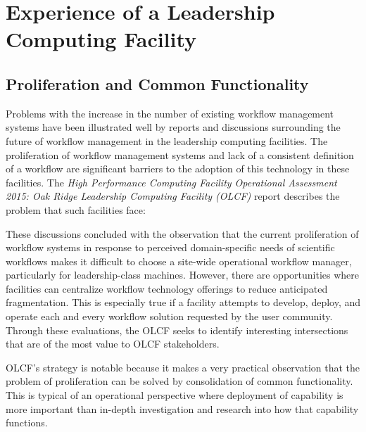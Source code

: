 \section{Experience of a Leadership Computing Facility}\label{olcf}

\subsection{Proliferation and Common Functionality} \label{commonFunc}

Problems with the increase in the number of existing workflow management
systems have been illustrated well by reports and discussions surrounding the
future of workflow management in the leadership computing facilities. The
proliferation of workflow management systems and lack of a consistent
definition of a workflow are significant barriers to the adoption of this
technology in these facilities. The \textit{High Performance Computing Facility
Operational Assessment 2015: Oak Ridge Leadership Computing Facility (OLCF)}
report \cite{barker_scientific_2007} describes the problem that such
facilities face:  \begin{displayquote} These discussions concluded with the
observation that the current proliferation of workflow systems in response to
perceived domain-specific needs of scientific workflows makes it difficult to
choose a site-wide operational workflow manager, particularly for
leadership-class machines. However, there are opportunities where facilities
can centralize workflow technology offerings to reduce anticipated
fragmentation. This is especially true if a facility attempts to develop,
deploy, and operate each and every workflow solution requested by the user
community. Through these evaluations, the OLCF seeks to identify interesting
intersections that are of the most value to OLCF stakeholders.
\end{displayquote}  OLCF's strategy is notable because it makes a
very practical observation that the problem of proliferation can be solved by
consolidation of common functionality. This is typical of an operational
perspective where deployment of capability is more important than in-depth
investigation and research into how that capability functions.